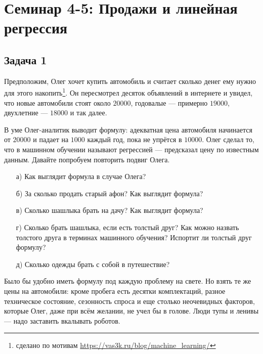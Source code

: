 \documentclass[12pt, a4paper, oneside]{article}
\begin{document}
	
\section*{Семинар 4-5: Продажи и линейная регрессия }

\subsection*{Задача 1}

Предположим, Олег хочет купить автомобиль и считает сколько денег ему нужно для этого накопить\footnote{сделано по мотивам \url{https://vas3k.ru/blog/machine_learning/}}. Он пересмотрел десяток объявлений в интернете и увидел, что новые автомобили стоят около $20 000$, годовалые — примерно $19 000$, двухлетние — $18 000$ и так далее.

В уме Олег-аналитик выводит формулу: адекватная цена автомобиля начинается от $20 000$ и падает на $1000$ каждый год, пока не упрётся в $10 000$. Олег сделал то, что в машинном обучении называют регрессией — предсказал цену по известным данным. Давайте попробуем повторить подвиг Олега.

\begin{enumerate}
	\item[а)] Как выглядит формула в случае Олега?
	\item[б)] За сколько продать старый афон? Как выглядит формула?
	\item[в)] Сколько шашлыка брать на дачу? Как выглядит формула?
	\item[г)] Сколько брать шашлыка, если есть толстый друг? Как можно назвать толстого друга в терминах машинного обучения? Испортит ли толстый друг формулу?
	\item[д)] Сколько одежды брать с собой в путешествие? 
\end{enumerate}

Было бы удобно иметь формулу под каждую проблему на свете. Но взять те же цены на автомобили: кроме пробега есть десятки комплектаций, разное техническое состояние, сезонность спроса и еще столько неочевидных факторов, которые Олег, даже при всём желании, не учел бы в голове. Люди тупы и ленивы — надо заставить вкалывать роботов.
\end{document}

